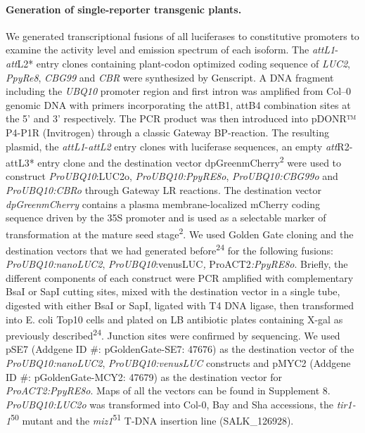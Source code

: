 \documentclass[]{article}
\begin{document}
\paragraph{Generation of single-reporter transgenic
plants.}\label{generation-of-single-reporter-transgenic-plants.}

We generated transcriptional fusions of all luciferases to constitutive
promoters to examine the activity level and emission spectrum of each
isoform. The \emph{attL1}-\emph{att}L2* entry clones containing
plant-codon optimized coding sequence of \emph{LUC2}, \emph{PpyRe8},
\emph{CBG99} and \emph{CBR} were synthesized by Genscript. A DNA
fragment including the \emph{UBQ10} promoter region and first intron was
amplified from Col--0 genomic DNA with primers incorporating the attB1,
attB4 combination sites at the 5' and 3' respectively. The PCR product
was then introduced into pDONR™ P4-P1R (Invitrogen) through a classic
Gateway BP-reaction. The resulting plasmid, the
\emph{attL1}-\emph{attL2} entry clones with luciferase sequences, an
empty \emph{att}R2-attL3* entry clone and the destination vector
dpGreenmCherry\textsuperscript{2} were used to construct
\emph{ProUBQ10}:LUC2o, \emph{ProUBQ10:PpyRE8o}, \emph{ProUBQ10:CBG99o}
and \emph{ProUBQ10:CBRo} through Gateway LR reactions. The destination
vector \emph{dpGreenmCherry} contains a plasma membrane-localized
mCherry coding sequence driven by the 35S promoter and is used as a
selectable marker of transformation at the mature seed
stage\textsuperscript{2}. We used Golden Gate cloning and the
destination vectors that we had generated before\textsuperscript{24} for
the following fusions: \emph{ProUBQ10:nanoLUC2},
\emph{ProUBQ10}:venusLUC\emph{, }ProACT2\emph{:PpyRE8o}. Briefly, the
different components of each construct were PCR amplified with
complementary BsaI or SapI cutting sites, mixed with the destination
vector in a single tube, digested with either BsaI or SapI, ligated with
T4 DNA ligase, then transformed into E. coli Top10 cells and plated on
LB antibiotic plates containing X-gal as previously
described\textsuperscript{24}. Junction sites were confirmed by
sequencing. We used pSE7 (Addgene ID \#: pGoldenGate-SE7: 47676) as the
destination vector of the \emph{ProUBQ10:nanoLUC2},
\emph{ProUBQ10:venusLUC} constructs and pMYC2 (Addgene ID \#:
pGoldenGate-MCY2: 47679) as the destination vector for
\emph{ProACT2:PpyRE8o}. Maps of all the vectors can be found in
Supplement 8. \emph{ProUBQ10:LUC2o} was transformed into Col-0, Bay and
Sha accessions, the \emph{tir1-1}\textsuperscript{50} mutant and the
\emph{miz1}\textsuperscript{51} T-DNA insertion line (SALK\_126928).
\end{document}
